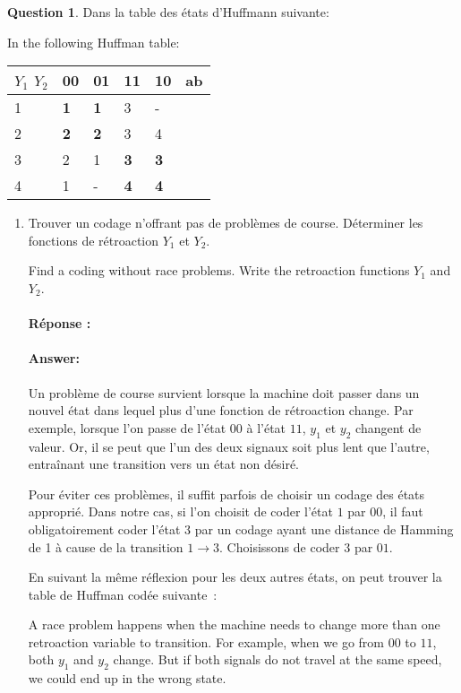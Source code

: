 \documentclass[11pt,a4paper,dvipsnames]{article}
\theoremstyle{definition}%
\newtheorem{Q}{Question}[] %
\newcommand{\reponse}[1]{%
	\ifthenelse {\boolean{corrige}} {\fr{\paragraph{Réponse :}}\en{\paragraph{Answer:}} \color{darkblue}   #1\color{black}} {}
 }
\newcommand{\fr}[1]{
 	\ifthenelse {\boolean{fr}} {#1} {}
 }
\newcommand{\en}[1]{
 	\ifthenelse {\boolean{en}} {#1} {}
 }
\begin{document}
\begin{Q}
	\fr{Dans la table des états d'Huffmann suivante:}
	\en{In the following Huffman table:}
	\begin{center}
		\begin{tabular}{|l|l|l|l|l|l}
		\hline
		 $Y_1$ $Y_2$ & 00         & 01         & 11         & 10         & \multicolumn{1}{l|}{ab} \\ \hline
		1 & \textbf{1} & \textbf{1} & 3          & -          &    \\ \cline{1-5}
		2 & \textbf{2} & \textbf{2} & 3          & 4          &    \\ \cline{1-5}
		3 & 2          & 1          & \textbf{3} & \textbf{3} &    \\ \cline{1-5}
		4 & 1          & -          & \textbf{4} & \textbf{4} &    \\ \cline{1-5}
		\end{tabular}

	\end{center}

	\begin{enumerate}
		\item \fr{Trouver un codage n'offrant pas de problèmes de course. Déterminer les fonctions de
		rétroaction $Y_1$ et $Y_2$.}
		\en{Find a coding without race problems. Write the retroaction functions $Y_1$ and $Y_2$.}


		\reponse{
			\fr{Un problème de course survient lorsque la machine doit passer dans un nouvel état dans lequel plus d'une fonction de rétroaction change.
			Par exemple, lorsque l'on passe de l'état $00$ à l'état $11$, $y_1$ et $y_2$ changent de valeur.
			Or, il se peut que l'un des deux signaux soit plus lent que l'autre, entraînant une transition vers un état non désiré.

			Pour éviter ces problèmes, il suffit parfois de choisir un codage des états approprié.
			Dans notre cas, si l'on choisit de coder l'état $1$ par $00$, il faut obligatoirement coder l'état $3$ par un codage ayant une distance de Hamming de 1 à cause de la transition $1 \rightarrow 3$.
			Choisissons de coder $3$ par $01$.

			En suivant la même réflexion pour les deux autres états, on peut trouver la table de Huffman codée suivante~:}

			\en{A race problem happens when the machine needs to change more than one retroaction variable to transition.
			For example, when we go from $00$ to $11$, both $y_1$ and $y_2$ change.
			But if both signals do not travel at the same speed, we could end up in the wrong state.

}}
\end{enumerate}
\end{Q}
\end{document}
